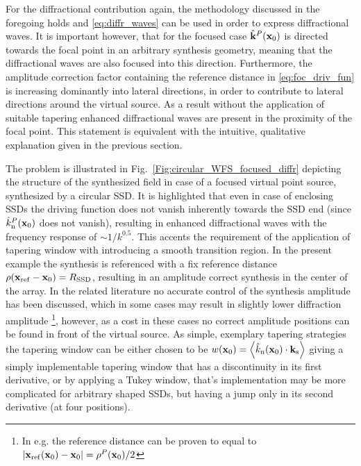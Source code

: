 \documentclass[lettersize,journal]{IEEEtran}
\begin{document}
For the diffractional contribution again, the methodology discussed in the foregoing holds and \eqref{eq:diffr_waves} can be used in order to express diffractional waves.
It is important however, that for the focused case $\hat{\mathbf{k}}^P(\mathbf{x}_0)$ is directed towards the focal point in an arbitrary synthesis geometry, meaning that the diffractional waves are also focused into this direction.
Furthermore, the amplitude correction factor containing the reference distance in \eqref{eq:foc_driv_fun} is increasing dominantly into lateral directions, in order to contribute to lateral directions around the virtual source.
As a result without the application of suitable tapering enhanced diffractional waves are present in the proximity of the focal point.  
This statement is equivalent with the intuitive, qualitative explanation given in the previous section.

The problem is illustrated in Fig.~\ref{Fig:circular_WFS_focused_diffr} depicting the structure of the synthesized field in case of a focused virtual point source, synthesized by a circular SSD. 
It is highlighted that even in case of enclosing SSDs the driving function does not vanish inherently towards the SSD end (since $\hat{k}_\mathrm{n}^P(\mathbf{x}_0)$ does not vanish), resulting in enhanced diffractional waves with the frequency response of $\sim 1/k^{0.5}$.
This accents the requirement of the application of tapering window with introducing a smooth transition region.
In the present example the synthesis is referenced with a fix reference distance $\rho(\mathbf{x}_{\mathrm{ref}}-\mathbf{x}_0) = R_{\mathrm{SSD}}$, resulting in an amplitude correct synthesis in the center of the array.
In the related literature no accurate control of the synthesis amplitude has been discussed, which in some cases may result in slightly lower diffraction amplitude \footnote{In e.g. \cite{Spors2009focused} the reference distance can be proven to equal to $|\mathbf{x}_{\mathrm{ref}}(\mathbf{x}_0)-\mathbf{x}_0| = \rho^P(\mathbf{x}_0)/2$ }, however, as a cost in these cases no correct amplitude positions can be found in front of the virtual source. 
As simple, exemplary tapering strategies the tapering window can be either chosen to be $w(\mathbf{x}_0) = \left< \hat{k}_\mathrm{n}(\mathbf{x}_0) \cdot \mathbf{k}_{\mathrm{s}} \right>$ giving a simply implementable tapering window that has a discontinuity in its first derivative, or by applying a Tukey window, that's implementation may be more complicated for arbitrary shaped SSDs, but having a jump only in its second derivative (at four positions).
\end{document}
